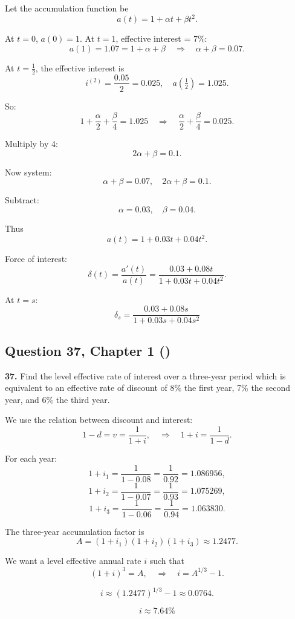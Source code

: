 \documentclass[12pt, a4paper]{article}
\begin{document}
\bigskip
Let the accumulation function be
\[
a(t) = 1 + \alpha t + \beta t^2.
\]

At \(t=0\), \(a(0)=1\).  
At \(t=1\), effective interest = 7\%:
\[
a(1) = 1.07 = 1 + \alpha + \beta \quad \Rightarrow \quad \alpha + \beta = 0.07.
\]

At \(t=\tfrac{1}{2}\), the effective interest is 
\[
i^{(2)} = \frac{0.05}{2} = 0.025,
\quad a\!\left(\tfrac{1}{2}\right) = 1.025.
\]

So:
\[
1 + \frac{\alpha}{2} + \frac{\beta}{4} = 1.025 
\quad \Rightarrow \quad \frac{\alpha}{2} + \frac{\beta}{4} = 0.025.
\]

Multiply by 4:
\[
2\alpha + \beta = 0.1.
\]

Now system:
\[
\alpha + \beta = 0.07, \quad 2\alpha + \beta = 0.1.
\]

Subtract:
\[
\alpha = 0.03, \quad \beta = 0.04.
\]

Thus
\[
a(t) = 1 + 0.03t + 0.04t^2.
\]

Force of interest:
\[
\delta(t) = \frac{a'(t)}{a(t)} 
= \frac{0.03 + 0.08t}{1+0.03t+0.04t^2}.
\]

At \(t=s\):
\[
\boxed{\delta_s = \frac{0.03 + 0.08s}{1+0.03s+0.04s^2}}
\]


\subsection*{Question 37, Chapter 1  (\cite{toi3rd})}

\textbf{37.} Find the level effective rate of interest over a three-year period 
which is equivalent to an effective rate of discount of 8\% the first year, 
7\% the second year, and 6\% the third year.

\bigskip
We use the relation between discount and interest:
\[
1-d = v = \frac{1}{1+i}, 
\quad \Rightarrow \quad 1+i = \frac{1}{1-d}.
\]

For each year:
\[
1+i_1 = \frac{1}{1-0.08} = \frac{1}{0.92} = 1.086956,
\]
\[
1+i_2 = \frac{1}{1-0.07} = \frac{1}{0.93} = 1.075269,
\]
\[
1+i_3 = \frac{1}{1-0.06} = \frac{1}{0.94} = 1.063830.
\]

The three-year accumulation factor is
\[
A = (1+i_1)(1+i_2)(1+i_3) \approx 1.2477.
\]

We want a level effective annual rate \(i\) such that
\[
(1+i)^3 = A,
\quad \Rightarrow \quad i = A^{1/3} - 1.
\]

\[
i \approx (1.2477)^{1/3} - 1 \approx 0.0764.
\]

\[
\boxed{i \approx 7.64\%}
\]
\end{document}
